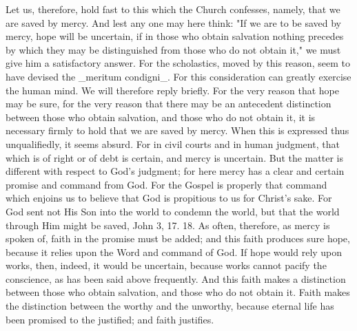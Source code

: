 Let us, therefore, hold fast to this which the Church confesses,
namely, that we are saved by mercy.  And lest any one may here think:
"If we are to be saved by mercy, hope will be uncertain, if in those
who obtain salvation nothing precedes by which they may be
distinguished from those who do not obtain it," we must give him a
satisfactory answer.  For the scholastics, moved by this reason, seem
to have devised the _meritum condigni_.  For this consideration can
greatly exercise the human mind.  We will therefore reply briefly.
For the very reason that hope may be sure, for the very reason that
there may be an antecedent distinction between those who obtain
salvation, and those who do not obtain it, it is necessary firmly to
hold that we are saved by mercy.  When this is expressed thus
unqualifiedly, it seems absurd.  For in civil courts and in human
judgment, that which is of right or of debt is certain, and mercy is
uncertain.  But the matter is different with respect to God's
judgment; for here mercy has a clear and certain promise and command
from God.  For the Gospel is properly that command which enjoins us
to believe that God is propitious to us for Christ's sake.  For God
sent not His Son into the world to condemn the world, but that the
world through Him might be saved, John 3, 17. 18. As often, therefore,
as mercy is spoken of, faith in the promise must be added; and this
faith produces sure hope, because it relies upon the Word and command
of God.  If hope would rely upon works, then, indeed, it would be
uncertain, because works cannot pacify the conscience, as has been
said above frequently.  And this faith makes a distinction between
those who obtain salvation, and those who do not obtain it.  Faith
makes the distinction between the worthy and the unworthy, because
eternal life has been promised to the justified; and faith justifies.

